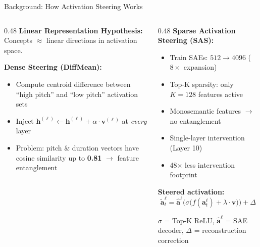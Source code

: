 \documentclass[aspectratio=169, 11pt]{beamer}
\begin{document}
\begin{frame}{Background: How Activation Steering Works}

\begin{columns}[T]
\begin{column}{0.48\textwidth}
\textbf{Linear Representation Hypothesis:}\\
Concepts $\approx$ linear directions in activation space.

\vspace{0.5em}
\textbf{Dense Steering (DiffMean):}
\begin{itemize}
  \item Compute centroid difference between ``high pitch'' and ``low pitch'' activation sets
  \item Inject $\mathbf{h}^{(\ell)} \leftarrow \mathbf{h}^{(\ell)} + \alpha \cdot \mathbf{v}^{(\ell)}$ at \emph{every} layer
  \item Problem: pitch \& duration vectors have cosine similarity up to \textbf{0.81} $\to$ feature entanglement
\end{itemize}
\end{column}

\begin{column}{0.48\textwidth}
\textbf{Sparse Activation Steering (SAS):}
\begin{itemize}
  \item Train SAEs: $512 \to 4096$ ($8\times$ expansion)
  \item Top-K sparsity: only $K{=}128$ features active
  \item Monosemantic features $\to$ no entanglement
  \item Single-layer intervention (Layer 10)
  \item 48$\times$ less intervention footprint
\end{itemize}

\vspace{0.3em}
\textbf{Steered activation:}
$$\tilde{\mathbf{a}}_t^\ell = \hat{\mathbf{a}}^\ell\!\Big(\sigma\!\big(f(\mathbf{a}_t^\ell) + \lambda \cdot \mathbf{v}\big)\Big) + \Delta$$

\vspace{0.2em}
{\footnotesize $\sigma$ = Top-K ReLU, $\hat{\mathbf{a}}^\ell$ = SAE decoder, $\Delta$ = reconstruction correction}
\end{column}
\end{columns}

\end{frame}
\end{document}
